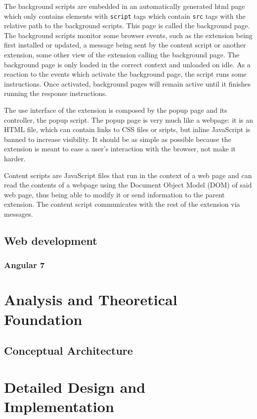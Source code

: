 \documentclass[12pt,a4paper,twoside]{report}
\begin{document}
The background scripts are embedded in an automatically generated html page which only contains elements with \lstinline$script$ tags which contain \lstinline$src$ tags with the relative path to the background scripts. This page is called the background page. The background scripts monitor some browser events, such as the extension being first installed or updated, a message being sent by the content script or another extension, some other view of the extension calling the background page. The background page is only loaded in the correct context and unloaded on idle. As a reaction to the events which activate the background page, the script runs some instructions. Once activated, background pages will remain active until it finishes running the response instructions.

The use interface of the extension is composed by the popup page and its controller, the popup script. The popup page is very much like a webpage: it is an HTML file, which can contain links to CSS files or sripts, but inline JavaScript is banned to increase visibility. It should be as simple as possible because the extension is meant to ease a user's interaction with the browser, not make it harder.

Content scripts are JavaScript files that run in the context of a web page and can read the contents of a webpage using the Document Object Model (DOM) of said web page, thus being able to modify it or send information to the parent extension. The content script communicates with the rest of the extension via messages.


\section{Web development}
\subsection{Angular 7}


\chapter{Analysis and Theoretical Foundation}

\section{Conceptual Architecture}


\chapter{Detailed Design and Implementation}
\end{document}
